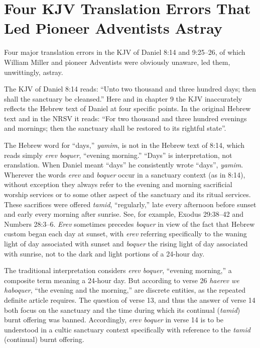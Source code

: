 \section{Four KJV Translation Errors That Led Pioneer Adventists Astray}

Four major translation errors in the KJV of Daniel 8:14 and 9:25--26, of
which William Miller and pioneer Adventists were obviously unaware, led
them, unwittingly, astray.

The KJV of Daniel 8:14 reads: ``Unto two thousand and three hundred days;
then shall the sanctuary be cleansed.'' Here and in chapter 9 the KJV
inaccurately reflects the Hebrew text of Daniel at four specific points. In
the original Hebrew text and in the NRSV it reads: ``For two thousand and
three hundred evenings and mornings; then the sanctuary shall be restored
to its rightful state''.

The Hebrew word for ``days,'' \textit{yamim}, is not in the Hebrew text of 8:14, which
reads simply \textit{erev boquer}, ``evening morning.'' ``Days'' is interpretation, not
eranslation. When Daniel meant ``days'' he consistently wrote ``days'',
\textit{yamim}. Wherever the words \textit{erev} and \textit{boquer} occur in a sanctuary context
(as in 8:14), without exception they always refer to the evening and morning
sacrificial worship services or to some other aspect of the sanctuary and
its ritual services. These sacrifices were offered \textit{tamid}, ``regularly,'' late
every afternoon before sunset and early every morning after sunrise. See,
for example, Exodus 29:38--42 and Numbers 28:3--6. \textit{Erev} sometimes precedes
\textit{boquer} in view of the fact that Hebrew custom began each day at sunset, with
\textit{erev} referring specifically to the waning light of day associated with
sunset and \textit{boquer} the rising light of day associated with sunrise, not to
the dark and light portions of a 24-hour day.

The traditional interpretation considers \textit{erev boquer}, ``evening morning,'' a
composite term meaning a 24-hour day. But according to verse 26 \textit{haerev we
haboquer}, ``the evening and the morning,'' are discrete entities, as the
repeated definite article requires. The question of verse 13, and thus the
answer of verse 14 both focus on the sanctuary and the time during which its
continual (\textit{tamid}) burnt offering was banned. Accordingly, \textit{erev boquer} in
verse 14 is to be understood in a cultic sanctuary context specifically with
reference to the \textit{tamid} (continual) burnt offering.

